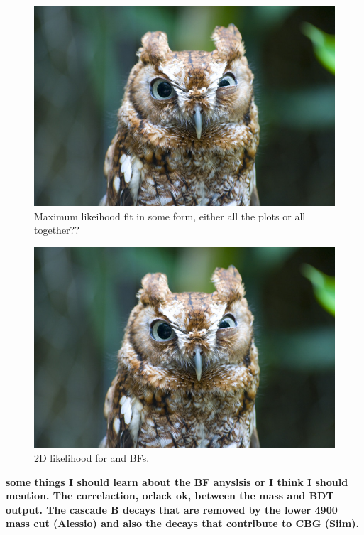 \begin{figure}[htbp]
    \centering
        \includegraphics[width= 0.8 \textwidth]{./Figs/BFAnalysis/placeholder.jpeg}
      \caption{Maximum likeihood fit in some form, either all the plots or all together?? }
    \label{fig:MLfit}
\end{figure}

\begin{figure}[htbp]
    \centering
        \includegraphics[width= 0.8 \textwidth]{./Figs/BFAnalysis/placeholder.jpeg}
      \caption{2D likelihood for \bd and \bs BFs. }
    \label{fig:contour}
\end{figure}


{\bf some things I should learn about the BF anyslsis or I think I should mention. The correlaction, orlack ok, between the mass and BDT output. The cascade B decays that are removed by the lower 4900 mass cut (Alessio) and also the decays that contribute to CBG (Siim).}
